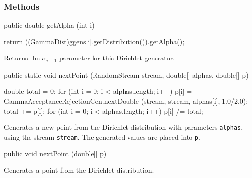 \subsubsection* {Methods}
\begin{code}

   public double getAlpha (int i)\begin{hide} {
      return ((GammaDist)ggens[i].getDistribution()).getAlpha();
   }\end{hide}
\end{code}
\begin{tabb}   Returns the $\alpha_{i+1}$ parameter for this
 Dirichlet generator.
\end{tabb}
\begin{htmlonly}
\end{htmlonly}
\begin{code}

   public static void nextPoint (RandomStream stream, double[] alphas,
                                 double[] p)\begin{hide} {
      double total = 0;
      for (int i = 0; i < alphas.length; i++) {
         p[i] = GammaAcceptanceRejectionGen.nextDouble
            (stream, stream, alphas[i], 1.0/2.0);
         total += p[i];
      }
      for (int i = 0; i < alphas.length; i++)
         p[i] /= total;
   }\end{hide}
\end{code}
\begin{tabb}   Generates a new point from the Dirichlet distribution with
 parameters \texttt{alphas}, using the stream \texttt{stream}.
 The generated values are placed into \texttt{p}.
\end{tabb}
\begin{htmlonly}
\end{htmlonly}
\begin{code}

   public void nextPoint (double[] p)\begin{hide} {
      int n = ggens.length;
      double total = 0;
      for (int i = 0; i < n; i++) {
         p[i] = ggens[i].nextDouble();
         total += p[i];
      }
      for (int i = 0; i < n; i++)
         p[i] /= total;
   }
}\end{hide}
\end{code}
\begin{tabb}  Generates a point from the Dirichlet distribution.
\end{tabb}
\begin{htmlonly}
\end{htmlonly}
